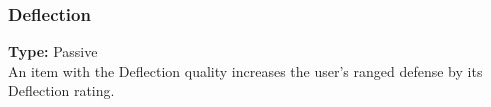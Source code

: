 \subsubsection{Deflection}
\label{iqty:deflection}
\textbf{Type:} Passive\\
An item with the Deflection quality increases the user’s
ranged defense by its Deflection rating.

